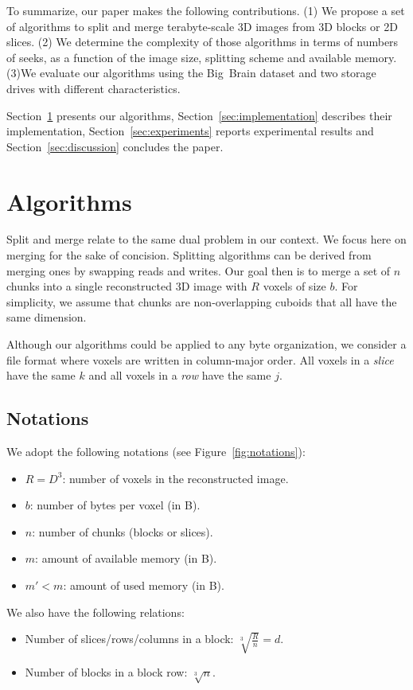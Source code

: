 \documentclass[10pt, conference, compsocconf]{IEEEtran}
\begin{document}
To summarize, our paper makes the following contributions. (1) We
propose a set of algorithms to split and merge terabyte-scale 3D
images from 3D blocks or 2D slices. (2) We determine the complexity of
those algorithms in terms of numbers of seeks, as a function of the image size, splitting scheme and available memory. (3)We evaluate our algorithms using the Big~Brain dataset and two storage drives with different characteristics.

Section~\ref{sec:algos} presents our algorithms,
Section~\ref{sec:implementation} describes their implementation,
Section~\ref{sec:experiments} reports experimental results and
Section~\ref{sec:discussion} concludes the paper.


\section{Algorithms}
\label{sec:algos}

Split and merge relate to the same dual problem in our context. We
focus here on merging for the sake of concision. Splitting algorithms
can be derived from merging ones by swapping reads and writes. Our
goal then is to merge a set of $n$ chunks into a single reconstructed
3D image with $R$ voxels of size $b$. For simplicity, we assume that
chunks are non-overlapping cuboids that all have the same dimension.

Although our algorithms could be applied to any byte organization, we
consider a file format where voxels are written in column-major
order. All voxels in a \emph{slice} have the same $k$ and all voxels
in a \emph{row} have the same $j$.  

\subsection{Notations}

We adopt the following notations (see Figure~\ref{fig:notations}):
\begin{itemize}
\item $R=D^3$: number of voxels in the reconstructed image.
\item $b$: number of bytes per voxel (in B).
\item $n$: number of chunks (blocks or slices).
\item $m$: amount of available memory (in B).
\item $m'<m$: amount of used memory (in B).
\end{itemize}
We also have the following relations:
\begin{itemize}
\item Number of slices/rows/columns in a block: $\sqrt[3]{\frac{R}{n}}=d$.
\item Number of blocks in a block row: $\sqrt[3]{n}$.
\end{itemize}
\end{document}
